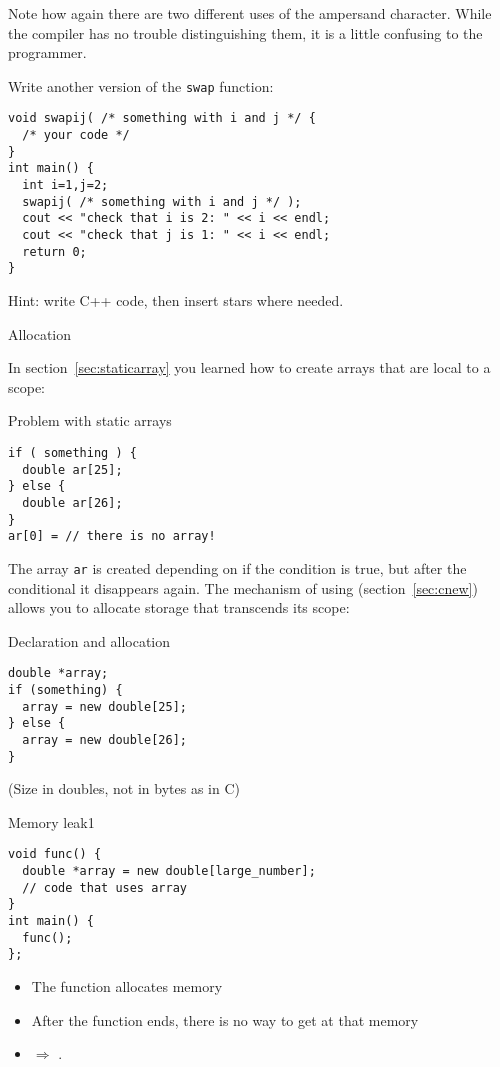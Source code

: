 Note how again there are two different uses of the ampersand
character.  While the compiler has no trouble distinguishing them, it
is a little confusing to the programmer.

\begin{exercise}
  \label{ex:c-star-swap}
  Write another version of the \lstinline{swap} function:
\begin{lstlisting}
void swapij( /* something with i and j */ {
  /* your code */
}
int main() {
  int i=1,j=2;
  swapij( /* something with i and j */ );
  cout << "check that i is 2: " << i << endl;
  cout << "check that j is 1: " << i << endl;
  return 0;
}
\end{lstlisting}
Hint: write C++ code, then insert stars where needed.
\end{exercise}

 {Allocation}

In section~\ref{sec:staticarray} you learned how to create arrays that
are local to a scope:

\begin{block}{Problem with static arrays}
  \label{sl:no-static-alloc}
\begin{lstlisting}
if ( something ) {
  double ar[25];
} else {
  double ar[26];
}
ar[0] = // there is no array!
\end{lstlisting}
\end{block}

The array \lstinline{ar} is created depending on if the condition is true, but
after
the conditional it disappears again. The mechanism of using
 (section~\ref{sec:cnew}) allows you to allocate
storage that transcends its scope:

\begin{block}{Declaration and allocation}
  \label{sl:c-array-new}
\begin{lstlisting}
double *array;
if (something) {
  array = new double[25];
} else {
  array = new double[26];
}
\end{lstlisting}
(Size in doubles, not in bytes as in C)
\end{block}

\begin{block}{Memory leak1}
  \label{sl:leak1}
\begin{lstlisting}
void func() {
  double *array = new double[large_number];
  // code that uses array
}
int main() {
  func();
};
\end{lstlisting}
\begin{itemize}
\item
  The function allocates memory
\item After the function ends, there is no way to get at that memory
\item $\Rightarrow$ .
\end{itemize}

\end{block}

